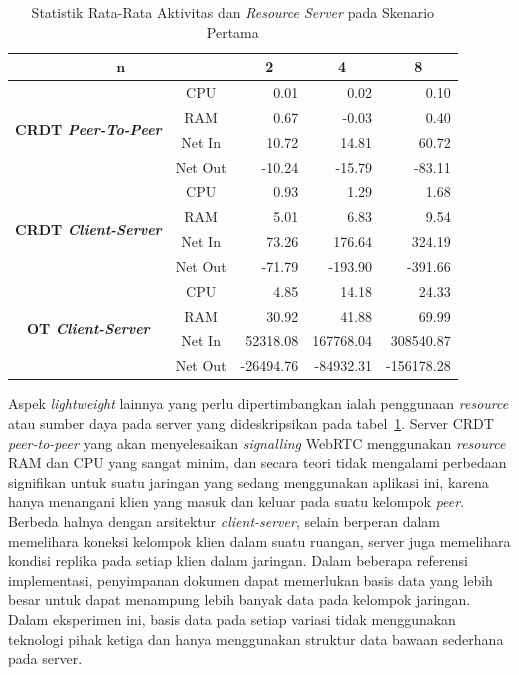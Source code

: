 \begin{table}[H]
 \centering
\begin{tabular}{|cc|r|r|r|}
\hline
\multicolumn{2}{|c|}{$\boldsymbol{n}$} & \multicolumn{1}{c|}{\textbf{2}} & \multicolumn{1}{c|}{\textbf{4}} & \multicolumn{1}{c|}{\textbf{8}} \\ \hline
\multicolumn{1}{|c|}{\multirow{4}{*}{\textbf{CRDT \textit{Peer-To-Peer}}}} & CPU & 0.01 & 0.02 & 0.10 \\ \cline{2-5}
\multicolumn{1}{|c|}{} & RAM & 0.67 & -0.03 & 0.40 \\ \cline{2-5}
\multicolumn{1}{|c|}{} & Net In & 10.72 & 14.81 & 60.72 \\ \cline{2-5}
\multicolumn{1}{|c|}{} & Net Out & -10.24 & -15.79 & -83.11 \\ \hline
\multicolumn{1}{|c|}{\multirow{4}{*}{\textbf{CRDT \textit{Client-Server}}}} & CPU & 0.93 & 1.29 & 1.68 \\ \cline{2-5}
\multicolumn{1}{|c|}{} & RAM & 5.01 & 6.83 & 9.54 \\ \cline{2-5}
\multicolumn{1}{|c|}{} & Net In & 73.26 & 176.64 & 324.19 \\ \cline{2-5}
\multicolumn{1}{|c|}{} & Net Out & -71.79 & -193.90 & -391.66 \\ \hline
\multicolumn{1}{|c|}{\multirow{4}{*}{\textbf{OT \textit{Client-Server}}}} & CPU & 4.85 & 14.18 & 24.33 \\ \cline{2-5}
\multicolumn{1}{|c|}{} & RAM & 30.92 & 41.88 & 69.99 \\ \cline{2-5}
\multicolumn{1}{|c|}{} & Net In & 52318.08 & 167768.04 & 308540.87 \\ \cline{2-5}
\multicolumn{1}{|c|}{} & Net Out & -26494.76 & -84932.31 & -156178.28 \\ \hline
\end{tabular}
 \caption{Statistik Rata-Rata Aktivitas dan \textit{Resource Server} pada Skenario Pertama}
 \label{tab:resource-server-1}
\end{table}

Aspek \textit{lightweight} lainnya yang perlu dipertimbangkan ialah penggunaan \textit{resource} atau sumber daya pada server yang dideskripsikan pada tabel~\ref{tab:resource-server-1}. Server CRDT \textit{peer-to-peer} yang akan menyelesaikan \textit{signalling} WebRTC menggunakan \textit{resource} RAM dan CPU yang sangat minim, dan secara teori tidak mengalami perbedaan signifikan untuk suatu jaringan yang sedang menggunakan aplikasi ini, karena hanya menangani klien yang masuk dan keluar pada suatu kelompok \textit{peer}. Berbeda halnya dengan arsitektur \textit{client-server}, selain berperan dalam memelihara koneksi kelompok klien dalam suatu ruangan, server juga memelihara kondisi replika pada setiap klien dalam jaringan. Dalam beberapa referensi implementasi, penyimpanan dokumen dapat memerlukan basis data yang lebih besar untuk dapat menampung lebih banyak data pada kelompok jaringan. Dalam eksperimen ini, basis data pada setiap variasi tidak menggunakan teknologi pihak ketiga dan hanya menggunakan struktur data bawaan sederhana pada server.

